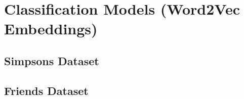 \section{Classification Models (Word2Vec Embeddings)}

\subsection{Simpsons Dataset}

\subsection{Friends Dataset}